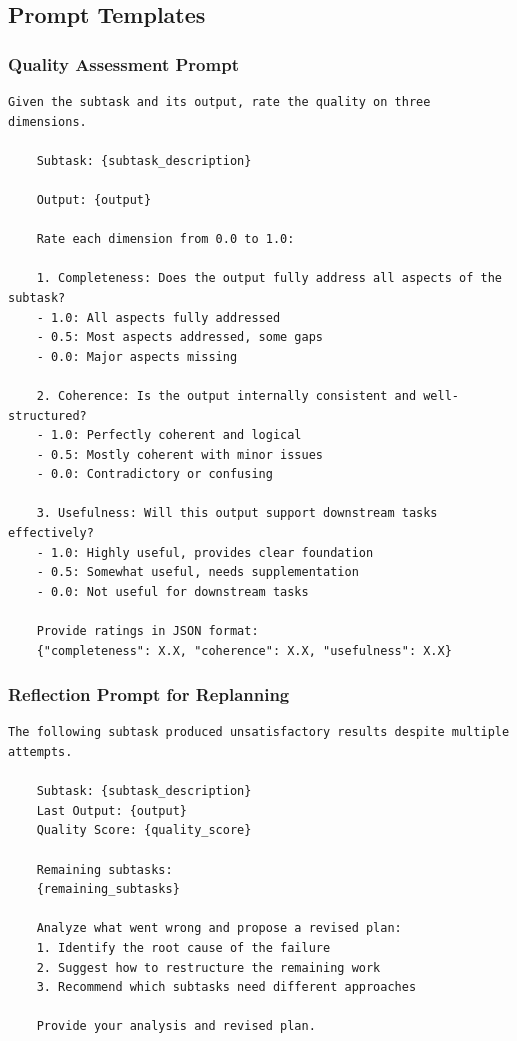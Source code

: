 \documentclass{article}
\theoremstyle{plain}
\theoremstyle{definition}
\theoremstyle{remark}
\begin{document}
\subsection{Prompt Templates}

\subsubsection{Quality Assessment Prompt}

\begin{lstlisting}[basicstyle=\small\ttfamily, breaklines=true]
	Given the subtask and its output, rate the quality on three dimensions.
	
	Subtask: {subtask_description}
	
	Output: {output}
	
	Rate each dimension from 0.0 to 1.0:
	
	1. Completeness: Does the output fully address all aspects of the subtask?
	- 1.0: All aspects fully addressed
	- 0.5: Most aspects addressed, some gaps
	- 0.0: Major aspects missing
	
	2. Coherence: Is the output internally consistent and well-structured?
	- 1.0: Perfectly coherent and logical
	- 0.5: Mostly coherent with minor issues
	- 0.0: Contradictory or confusing
	
	3. Usefulness: Will this output support downstream tasks effectively?
	- 1.0: Highly useful, provides clear foundation
	- 0.5: Somewhat useful, needs supplementation
	- 0.0: Not useful for downstream tasks
	
	Provide ratings in JSON format:
	{"completeness": X.X, "coherence": X.X, "usefulness": X.X}
\end{lstlisting}

\subsubsection{Reflection Prompt for Replanning}

\begin{lstlisting}[basicstyle=\small\ttfamily, breaklines=true]
	The following subtask produced unsatisfactory results despite multiple attempts.
	
	Subtask: {subtask_description}
	Last Output: {output}
	Quality Score: {quality_score}
	
	Remaining subtasks:
	{remaining_subtasks}
	
	Analyze what went wrong and propose a revised plan:
	1. Identify the root cause of the failure
	2. Suggest how to restructure the remaining work
	3. Recommend which subtasks need different approaches
	
	Provide your analysis and revised plan.
\end{lstlisting}
\end{document}
